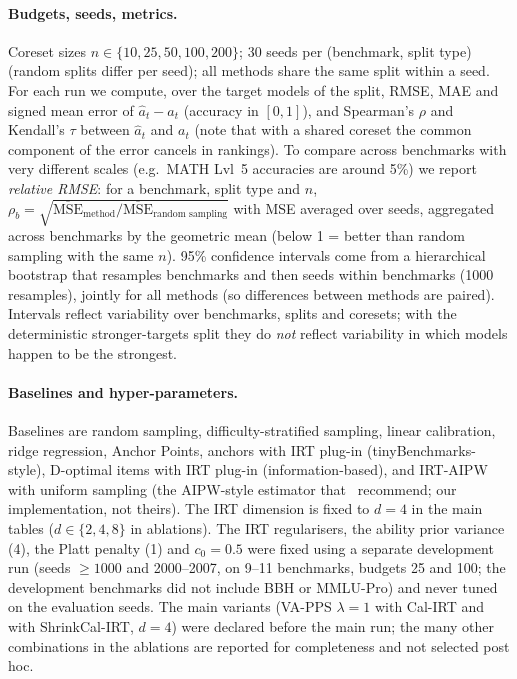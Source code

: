 \paragraph{Budgets, seeds, metrics.}
Coreset sizes $n\in\{10,25,50,100,200\}$; 30 seeds per (benchmark, split type) (random splits differ per seed); all methods share the same split within a seed. For each run we compute, over the target models of the split, RMSE, MAE and signed mean error of $\hat a_t-a_t$ (accuracy in $[0,1]$), and Spearman's $\rho$ and Kendall's $\tau$ between $\hat a_t$ and $a_t$ (note that with a shared coreset the common component of the error cancels in rankings). To compare across benchmarks with very different scales (e.g.\ MATH Lvl~5 accuracies are around 5\%) we report \emph{relative RMSE}: for a benchmark, split type and $n$, $\rho_b=\sqrt{\overline{\mathrm{MSE}}_{\text{method}}/\overline{\mathrm{MSE}}_{\text{random sampling}}}$ with MSE averaged over seeds, aggregated across benchmarks by the geometric mean (below 1 = better than random sampling with the same $n$). 95\% confidence intervals come from a hierarchical bootstrap that resamples benchmarks and then seeds within benchmarks (1000 resamples), jointly for all methods (so differences between methods are paired). Intervals reflect variability over benchmarks, splits and coresets; with the deterministic stronger-targets split they do \emph{not} reflect variability in which models happen to be the strongest.

\paragraph{Baselines and hyper-parameters.}
Baselines are random sampling, difficulty-stratified sampling, linear calibration, ridge regression, Anchor Points, anchors with IRT plug-in (tinyBenchmarks-style), D-optimal items with IRT plug-in (information-based), and IRT-AIPW with uniform sampling (the AIPW-style estimator that~\citet{zhang2025misses} recommend; our implementation, not theirs). The IRT dimension is fixed to $d=4$ in the main tables ($d\in\{2,4,8\}$ in ablations). The IRT regularisers, the ability prior variance (4), the Platt penalty (1) and $c_0=0.5$ were fixed using a separate development run (seeds $\ge1000$ and 2000--2007, on 9--11 benchmarks, budgets 25 and 100; the development benchmarks did not include BBH or MMLU-Pro) and never tuned on the evaluation seeds. The main variants (VA-PPS $\lambda=1$ with Cal-IRT and with ShrinkCal-IRT, $d=4$) were declared before the main run; the many other combinations in the ablations are reported for completeness and not selected post hoc.
